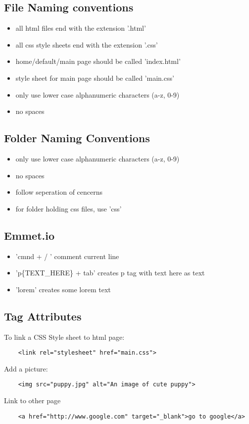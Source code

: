 \documentclass[]{article}
\newcommand{\<}{\guilsinglleft}
\renewcommand{\>}{\guilsinglright}
\begin{document}
\subsection{File Naming conventions}
	\begin{itemize}
		\item all html files end with the extension '.html'
		\item all css style sheets end with the extension '.css'
		\item home/default/main page should be called 'index.html'
		\item style sheet for main page should be called 'main.css'
		\item only use lower case alphanumeric characters (a-z, 0-9) 
		\item no spaces
	\end{itemize}
\subsection{Folder Naming Conventions}
	\begin{itemize}
		\item only use lower case alphanumeric characters (a-z, 0-9) 
		\item no spaces
		\item follow seperation of cencerns 
		\item for folder holding css files, use 'css'

	\end{itemize}

\subsection{Emmet.io}
	\begin{itemize}
		\item 'cmnd + / ' comment current line 
		\item 'p\{TEXT\_HERE\} + tab' creates p tag with text here as text 
		\item 'lorem' creates some lorem text
	\end{itemize}

\subsection{Tag Attributes}
	To link a CSS Style sheet to html page:
	\begin{lstlisting}
	<link rel="stylesheet" href="main.css">
	\end{lstlisting}
	Add a picture:
	\begin{lstlisting}
	<img src="puppy.jpg" alt="An image of cute puppy">
	\end{lstlisting}
	Link to other page
	\begin{lstlisting}
	<a href="http://www.google.com" target="_blank">go to google</a>
	\end{lstlisting}
	
\end{document}

